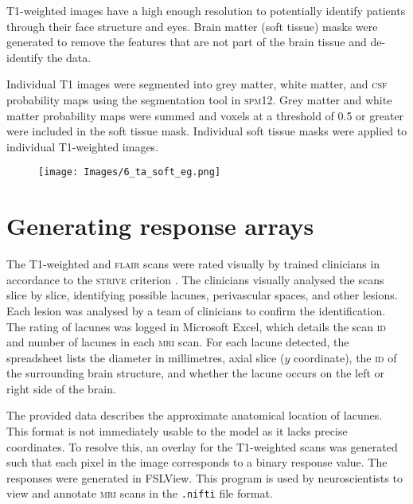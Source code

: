 T1-weighted images have a high enough resolution to potentially identify patients through their face structure and eyes. Brain matter (soft tissue) masks were generated to remove the features that are not part of the brain tissue and de-identify the data.

Individual T1 images were segmented into grey matter, white matter, and \textsc{csf} probability maps using the segmentation tool in \textsc{spm12}. Grey matter and white matter probability maps were summed and voxels at a threshold of 0.5 or greater were included in the soft tissue mask. Individual soft tissue masks were applied to individual T1-weighted images.

\begin{figure}[ht]
\centering
\texttt{[image: Images/6\_ta\_soft\_eg.png]}
\end{figure}



\section{Generating response arrays}\label{data-lacune}

The T1-weighted and \textsc{flair} scans were rated visually by trained clinicians in accordance to the \textsc{strive} criterion \cite{WardlawJ.M.2013Nsfr}. The clinicians visually analysed the scans slice by slice, identifying possible lacunes, perivascular spaces, and other lesions. Each lesion was analysed by a team of clinicians to confirm the identification. The rating of lacunes was logged in Microsoft Excel, which details the scan \textsc{id} and number of lacunes in each \textsc{mri} scan. For each lacune detected, the spreadsheet lists the diameter in millimetres, axial slice ($y$ coordinate), the \textsc{id} of the surrounding brain structure, and whether the lacune occurs on the left or right side of the brain.


The provided data describes the approximate anatomical location of lacunes. This format is not immediately usable to the model as it lacks precise coordinates. To resolve this, an overlay for the T1-weighted scans was generated such that each pixel in the image corresponds to a binary response value. The responses were generated in FSLView. This program is used by neuroscientists to view and annotate \textsc{mri} scans in the \texttt{.nifti} file format.

